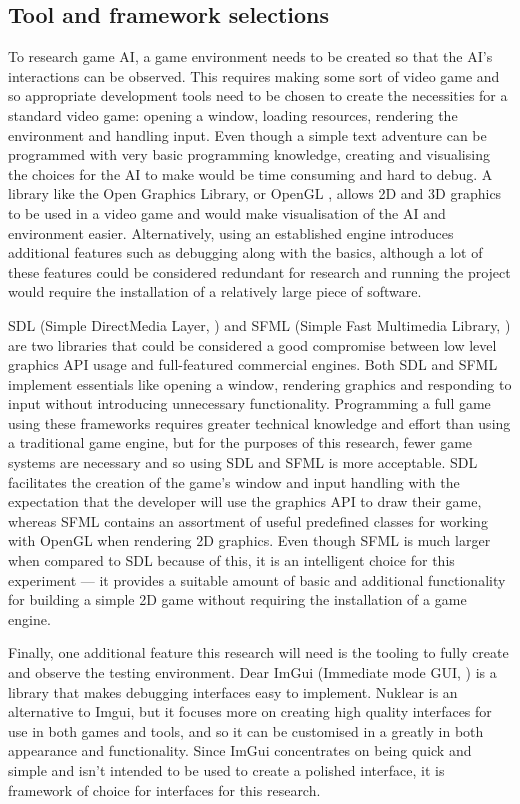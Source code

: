 \documentclass[11pt, a4paper]{report}
\begin{document}
\subsection{Tool and framework selections}
\label{subsec:toolAndFrameworkSelections}

To research game AI, a game environment needs to be created so that the AI's interactions can be observed. This requires making some sort of video game and so appropriate development tools need to be chosen to create the necessities for a standard video game: opening a window, loading resources, rendering the environment and handling input. Even though a simple text adventure can be programmed with very basic programming knowledge, creating and visualising the choices for the AI to make would be time consuming and hard to debug. A library like the Open Graphics Library, or OpenGL \parencite{OpenGL}, allows 2D and 3D graphics to be used in a video game and would make visualisation of the AI and environment easier. Alternatively, using an established engine introduces additional features such as debugging along with the basics, although a lot of these features could be considered redundant for research and running the project would require the installation of a relatively large piece of software.

SDL (Simple DirectMedia Layer, \cite{SDL}) and SFML (Simple Fast Multimedia Library, \cite{SFML}) are two libraries that could be considered a good compromise between low level graphics API usage and full-featured commercial engines. Both SDL and SFML implement essentials like opening a window, rendering graphics and responding to input without introducing unnecessary functionality. Programming a full game using these frameworks requires greater technical knowledge and effort than using a traditional game engine, but for the purposes of this research, fewer game systems are necessary and so using SDL and SFML is more acceptable. SDL facilitates the creation of the game's window and input handling with the expectation that the developer will use the graphics API to draw their game, whereas SFML contains an assortment of useful predefined classes for working with OpenGL when rendering 2D graphics. Even though SFML is much larger when compared to SDL because of this, it is an intelligent choice for this experiment --- it provides a suitable amount of basic and additional functionality for building a simple 2D game without requiring the installation of a game engine.

Finally, one additional feature this research will need is the tooling to fully create and observe the testing environment. Dear ImGui (Immediate mode GUI, \cite{Imgui}) is a library that makes debugging interfaces easy to implement. Nuklear \parencite{Nuklear} is an alternative to Imgui, but it focuses more on creating high quality interfaces for use in both games and tools, and so it can be customised in a greatly in both appearance and functionality. Since ImGui concentrates on being quick and simple and isn't intended to be used to create a polished interface, it is framework of choice for interfaces for this research.
\end{document}
